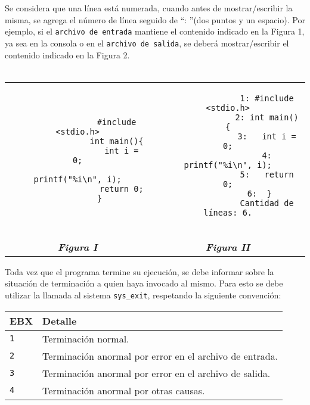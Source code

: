 \documentclass[12pt,a4paper]{article}
\begin{document}
Se considera que una línea está numerada, cuando antes de mostrar/escribir la misma, se agrega el número de línea seguido de ``: ''(dos puntos y un espacio). Por ejemplo, si el \texttt{archivo de entrada} mantiene el contenido indicado en la Figura 1, ya sea en la consola o en el \texttt{archivo de salida}, se deberá mostrar/escribir el contenido indicado en la Figura 2. \\ \\
\begin{centering}
	\begin{tabular}[t]{c|c}
		\begin{minipage}[t]{0.50\textwidth}
			\begin{verbatim}
				#include <stdio.h>
				int main(){
				  int i = 0;
				  printf("%i\n", i);
				  return 0;
				}		
			\end{verbatim}
		\end{minipage} &
		\begin{minipage}[t]{0.50\textwidth}
			\begin{verbatim}
				1: #include <stdio.h>
				2: int main(){
				3:   int i = 0;
				4:   printf("%i\n", i);
				5:   return 0;
				6:  }	
				Cantidad de líneas: 6.
				
			\end{verbatim}
		\end{minipage} \\
		\textbf{\textit{Figura I}} & \textbf{\textit{Figura II}}
	\end{tabular}
\end{centering}

Toda vez que el programa termine su ejecución, se debe informar sobre la situación de terminación a quien haya invocado al mismo. Para esto se debe utilizar la llamada al sistema \texttt{sys\_exit}, respetando la siguiente convención:
\begin{center}
	\begin{tabular}[t]{|l|l|}
		\hline \textbf{EBX} & \textbf{Detalle} \\ \hline
		\texttt{1} & Terminación normal. \\ \hline
		\texttt{2} & Terminación anormal por error en el archivo de entrada. \\ \hline
		\texttt{3} & Terminación anormal por error en el archivo de salida.\\ \hline
		\texttt{4} & Terminación anormal por otras causas.\\ \hline
	\end{tabular}
\end{center}
\end{document}
